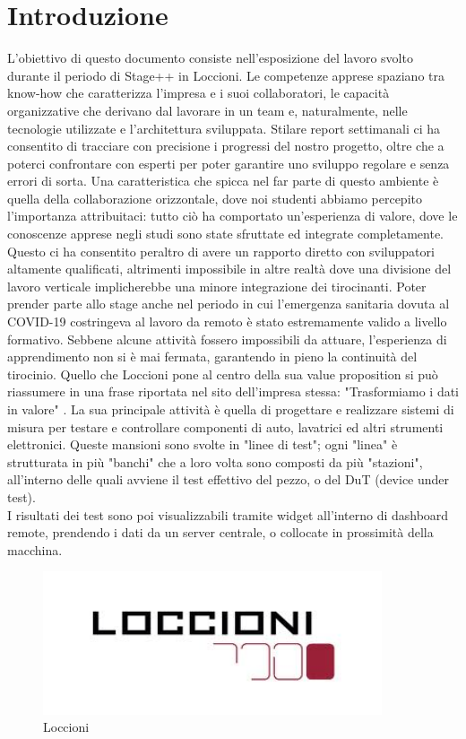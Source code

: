 \chapter{Introduzione}
\label{chap:intro}

L'obiettivo di questo documento consiste nell'esposizione del lavoro svolto durante il periodo di Stage++ in Loccioni. Le competenze apprese spaziano tra know-how che caratterizza l'impresa e i suoi collaboratori, le capacità organizzative che derivano dal lavorare in un team e, naturalmente, nelle tecnologie utilizzate e l'architettura sviluppata.
Stilare report settimanali ci ha consentito di tracciare con precisione i progressi del nostro progetto, oltre che a poterci confrontare con esperti per poter garantire uno sviluppo regolare e senza errori di sorta.
Una caratteristica che spicca nel far parte di questo ambiente è quella della collaborazione orizzontale, dove noi studenti abbiamo percepito l'importanza attribuitaci: tutto ciò ha comportato un'esperienza di valore, dove le conoscenze apprese negli studi sono state sfruttate ed integrate completamente.
Questo ci ha consentito peraltro di avere un rapporto diretto con sviluppatori altamente qualificati, altrimenti impossibile in altre realtà dove una divisione del lavoro verticale implicherebbe una minore integrazione dei tirocinanti.
Poter prender parte allo stage anche nel periodo in cui l'emergenza sanitaria dovuta al COVID-19 costringeva al lavoro da remoto è stato estremamente valido a livello formativo. Sebbene alcune attività fossero impossibili da attuare, l'esperienza di apprendimento non si è mai fermata, garantendo in pieno la continuità del tirocinio.
Quello che Loccioni pone al centro della sua value proposition si può riassumere in una frase riportata nel sito dell'impresa stessa: "Trasformiamo i dati in valore" \cite{Loccioni}.
La sua principale attività è quella di progettare e realizzare sistemi di misura per 
testare e controllare componenti di auto, lavatrici ed altri strumenti elettronici.
Queste mansioni sono svolte in "linee di test"; ogni "linea" è strutturata in più "banchi" che a loro volta sono composti da più "stazioni", all'interno delle quali avviene 
il test effettivo del pezzo, o del DuT (device under test).\\
I risultati dei test sono poi visualizzabili tramite widget all'interno di dashboard remote, prendendo i dati da un server centrale, 
o collocate in prossimità della macchina.
\begin{figure}[h!]
\begin{center}
  \includegraphics[width=10cm]{images/loccioni.jpg}
 \caption{Loccioni}
\end{center}
\end{figure}

